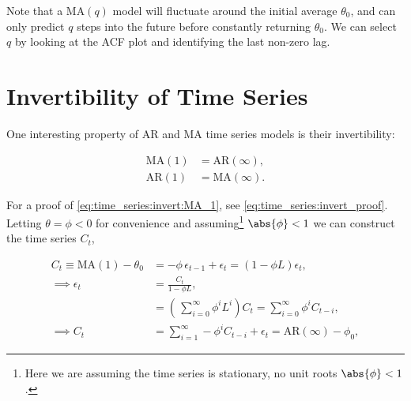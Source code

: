 Note that a $\text{MA}\left(q\right)$ model will fluctuate around the initial average $\theta_{0}$,
and can only predict $q$ steps into the future before constantly returning $\theta_{0}$.
We can select $q$ by looking at the ACF plot
and identifying the last non-zero lag.

\section{Invertibility of Time Series}
\label{time_series:invert}

One interesting property of AR and MA time series models is their invertibility:

\begin{subequations}\label{eq:time_series:invert}
\begin{align}
\text{MA}\left(1\right) &= \text{AR}\left(\infty\right), \label{eq:time_series:invert:MA_1} \\
\text{AR}\left(1\right) &= \text{MA}\left(\infty\right). \label{eq:time_series:invert:AR_1}
\end{align}
\end{subequations}

For a proof of \cref{eq:time_series:invert:MA_1}, see \cref{eq:time_series:invert_proof}.
Letting $\theta = \phi < 0$ for convenience and
assuming\footnote{Here we are assuming the time series is stationary, \ie no unit roots $\abs{\phi} < 1$.} $\abs{\phi} < 1$
we can construct the time series $C_{t}$,

\begin{subequations}\label{eq:time_series:invert_proof}
\begin{align}
C_{t} \equiv \text{MA}\left(1\right) - \theta_{0} &= -\phi\, \epsilon_{t-1} + \epsilon_{t} = \left(1 - \phi L \right) \epsilon_{t}, \label{eq:time_series:invert_proof:a} \\
\implies \epsilon_{t} &= \frac{C_{t}}{1 - \phi L}, \label{eq:time_series:invert_proof:b} \\
&= \left(\,\sum_{i=0}^{\infty} \phi^{i} L^{i} \right) C_{t} = \sum_{i=0}^{\infty} \phi^{i} C_{t-i}, \label{eq:time_series:invert_proof:c} \\
\implies C_{t} &= \sum_{i=1}^{\infty} -\phi^{i} C_{t-i} + \epsilon_{t} = \text{AR}\left(\infty\right) - \phi_{0}, \label{eq:time_series:invert_proof:d}
\end{align}
\end{subequations}

